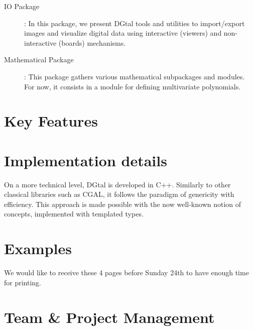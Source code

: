 \documentclass[11pt, a4paper]{article}
\begin{document}
\begin{description}
  \item[IO Package]: In this package, we present DGtal tools and
    utilities to import/export images and visualize digital data using
    interactive (viewers) and non-interactive (boards) mechanisms.

  \item[Mathematical Package]: This package gathers various
    mathematical subpackages and modules. For now, it consists in a
    module for defining multivariate polynomials.



\end{description}


\section*{Key Features}

\section*{Implementation details}
 
On a more technical level, DGtal is developed in C++. Similarly to
other classical libraries such as CGAL, it follows the paradigm of
genericity with efficiency. This approach is made possible with the
now well-known notion of concepts, implemented with templated types.



\section*{Examples}

We would like to receive these 4 pages before Sunday 24th to have
enough time for printing.

\section*{Team \& Project Management}
\end{document}
